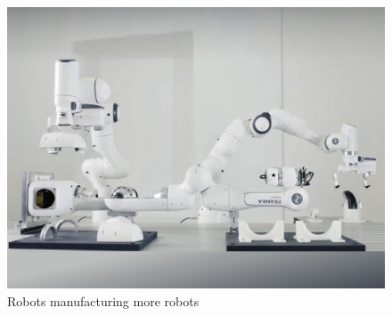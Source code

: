 \begin{figure}[!t]
	\centering
	\includegraphics[width=0.75\columnwidth]{fig/franka_builds_franka.jpg}
	\caption{Robots manufacturing more robots}
	\label{fig:franka_builds_franka}
\end{figure}
